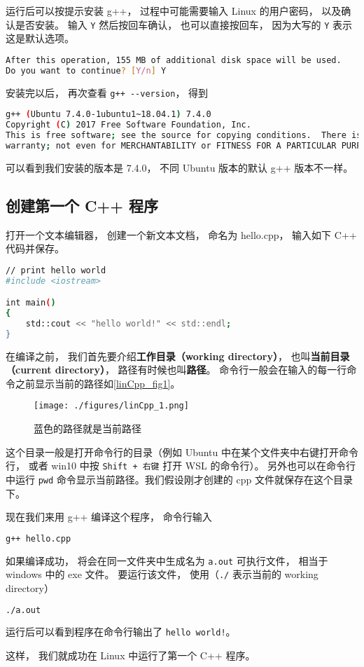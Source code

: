 运行后可以按提示安装 g++， 过程中可能需要输入 Linux 的用户密码， 以及确认是否安装。 输入 \verb|Y| 然后按回车确认， 也可以直接按回车， 因为大写的 \verb|Y| 表示这是默认选项。
\begin{lstlisting}[language=bash]
After this operation, 155 MB of additional disk space will be used.
Do you want to continue? [Y/n] Y
\end{lstlisting}

安装完以后， 再次查看 \verb|g++ --version|， 得到
\begin{lstlisting}[language=bash]
g++ (Ubuntu 7.4.0-1ubuntu1~18.04.1) 7.4.0
Copyright (C) 2017 Free Software Foundation, Inc.
This is free software; see the source for copying conditions.  There is NO
warranty; not even for MERCHANTABILITY or FITNESS FOR A PARTICULAR PURPOSE.
\end{lstlisting}
可以看到我们安装的版本是 7.4.0， 不同 Ubuntu 版本的默认 g++ 版本不一样。


\subsection{创建第一个 C++ 程序}
打开一个文本编辑器， 创建一个新文本文档， 命名为 hello.cpp， 输入如下 C++ 代码并保存。
\begin{lstlisting}[language=bash, caption=hello.cpp]
// print hello world
#include <iostream>

int main()
{
    std::cout << "hello world!" << std::endl;
}
\end{lstlisting}
在编译之前， 我们首先要介绍\textbf{工作目录（working directory）}， 也叫\textbf{当前目录（current directory）}， 路径有时候也叫\textbf{路径}。 命令行一般会在输入的每一行命令之前显示当前的路径如\autoref{linCpp_fig1}。
\begin{figure}[ht]
\centering
\texttt{[image: ./figures/linCpp\_1.png]}
\caption{蓝色的路径就是当前路径} \label{linCpp_fig1}
\end{figure}

这个目录一般是打开命令行的目录（例如 Ubuntu 中在某个文件夹中右键打开命令行， 或者 win10 中按 \verb|Shift + 右键| 打开 WSL 的命令行）。 另外也可以在命令行中运行 \verb|pwd| 命令显示当前路径。我们假设刚才创建的 cpp 文件就保存在这个目录下。

现在我们来用 g++ 编译这个程序， 命令行输入
\begin{lstlisting}[language=bash]
g++ hello.cpp
\end{lstlisting}
如果编译成功， 将会在同一文件夹中生成名为 \verb|a.out| 可执行文件， 相当于 windows 中的 exe 文件。 要运行该文件， 使用（\verb|./| 表示当前的 working directory）
\begin{lstlisting}[language=bash]
./a.out
\end{lstlisting}
运行后可以看到程序在命令行输出了 \verb|hello world!|。

这样， 我们就成功在 Linux 中运行了第一个 C++ 程序。
